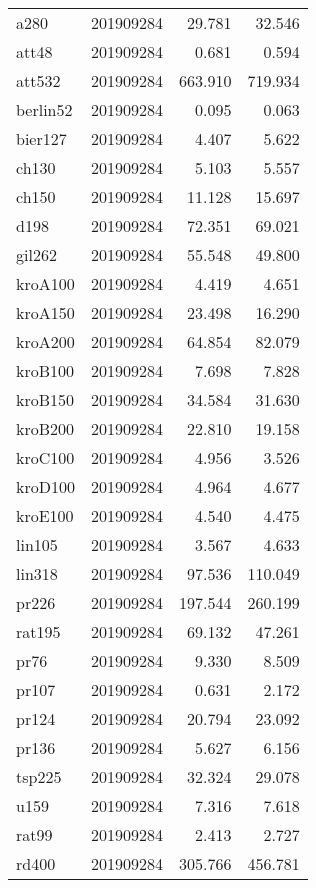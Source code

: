 \begin{center}
\begin{longtable}{llrr}
			a280 & 201909284 & 29.781 & 32.546 \\
			att48 & 201909284 & 0.681 & 0.594  \\
			att532 & 201909284 &  663.910 & 719.934\\
			berlin52 & 201909284 & 0.095 & 0.063  \\
			bier127 & 201909284 & 4.407 & 5.622 \\
			ch130 & 201909284 & 5.103 & 5.557  \\
			ch150 & 201909284 & 11.128 & 15.697  \\
			d198 & 201909284 & 72.351 & 69.021   \\
			gil262 & 201909284 & 55.548 & 49.800   \\
			kroA100 & 201909284 & 4.419 & 4.651   \\
			kroA150 & 201909284 & 23.498 & 16.290  \\
			kroA200 & 201909284 & 64.854 & 82.079   \\
			kroB100 & 201909284 & 7.698 & 7.828  \\
			kroB150 & 201909284 & 34.584 & 31.630  \\
			kroB200 & 201909284 & 22.810 & 19.158  \\
			kroC100 & 201909284 & 4.956 & 3.526   \\
			kroD100 & 201909284 & 4.964 & 4.677  \\
			kroE100 & 201909284 & 4.540 & 4.475  \\
			lin105 & 201909284 & 3.567 & 4.633   \\
			lin318 & 201909284 & 97.536 &110.049  \\
			pr226 & 201909284 & 197.544 & 260.199 \\
			rat195 & 201909284 & 69.132 & 47.261  \\
			pr76 & 201909284 & 9.330 & 8.509 \\
			pr107 & 201909284 & 0.631 & 2.172  \\
			pr124 & 201909284 & 20.794 & 23.092 \\
			pr136 & 201909284 & 5.627 & 6.156  \\
			tsp225 & 201909284 & 32.324 & 29.078  \\
			u159 & 201909284 & 7.316 & 7.618   \\
			rat99 & 201909284 & 2.413 & 2.727  \\
			rd400 & 201909284 & 305.766 & 456.781  \\
			

\end{longtable}
\end{center}

